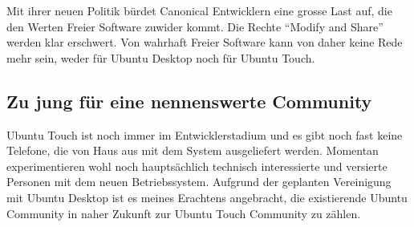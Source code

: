 Mit ihrer neuen Politik bürdet Canonical Entwicklern eine grosse Last auf, die den Werten Freier Software zuwider kommt. Die Rechte ``Modify and Share'' werden klar erschwert\thinspace\cite{online:ubuntutouch-mjgLicense}. Von wahrhaft Freier Software kann von daher keine Rede mehr sein, weder für Ubuntu Desktop noch für Ubuntu Touch.
\newline

\subsection{Zu jung für eine nennenswerte Community}
Ubuntu Touch ist noch immer im Entwicklerstadium und es gibt noch fast keine Telefone, die von Haus aus mit dem System ausgeliefert werden\thinspace\cite{online:ubuntutouch-wikipedia}. Momentan experimentieren wohl noch hauptsächlich technisch interessierte und versierte Personen mit dem neuen Betriebssystem. Aufgrund der geplanten Vereinigung mit Ubuntu Desktop ist es meines Erachtens angebracht, die existierende Ubuntu Community in naher Zukunft zur Ubuntu Touch Community zu zählen.